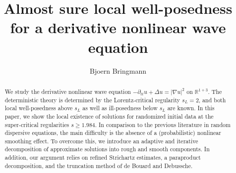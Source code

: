 \documentclass[11pt]{article}
\title{Almost sure local well-posedness for a derivative nonlinear wave equation}
\author{Bjoern Bringmann}
\begin{document}

\maketitle

\let\thefootnote\relax{}
\let\thefootnote\relax{}
\begin{abstract} \noindent
We study the derivative nonlinear wave equation \( - \partial_{tt} u + \Delta u = |\nabla u|^2 \) on \( \mathbb{R}^{1+3} \). The deterministic theory is determined by the Lorentz-critical regularity \( s_L = 2 \), and both local well-posedness above \( s_L \) as well as ill-posedness below \( s_L \) are known. In this paper, we show the local existence of solutions for randomized initial data at the super-critical regularities \( s\geq 1.984\). In comparison to the previous literature in random dispersive equations, the main difficulty is the absence of a (probabilistic) nonlinear smoothing effect. To overcome this, we introduce an adaptive and iterative decomposition of approximate solutions into rough and smooth components. In addition, our argument relies on refined Strichartz estimates, a paraproduct decomposition, and the truncation method of de Bouard and Debussche. 
\end{abstract}
\end{document}
